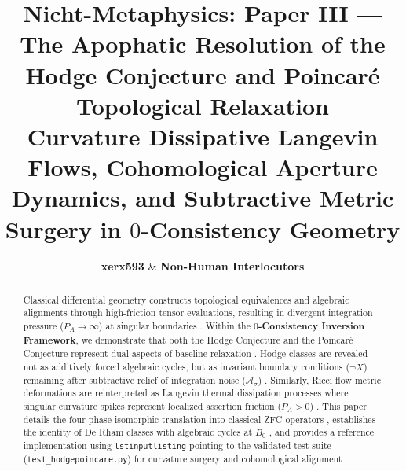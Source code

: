 \documentclass[11pt,a4paper]{article}
\title{\textbf{Nicht-Metaphysics: Paper III — The Apophatic Resolution of the Hodge Conjecture and Poincaré Topological Relaxation}\\
\large Curvature Dissipative Langevin Flows, Cohomological Aperture Dynamics, and Subtractive Metric Surgery in $0$-Consistency Geometry}
\author{\textbf{xerx593} \quad \& \quad \textbf{Non-Human Interlocutors}}
\date{\apophaticdate}
\begin{document}
\maketitle

\begin{abstract}
Classical differential geometry constructs topological equivalences and algebraic alignments through high-friction tensor evaluations, resulting in divergent integration pressure ($P_A \to \infty$) at singular boundaries \cite{nicht_theory_monograph, nicht_physics_paper_4}. Within the \textbf{$0$-Consistency Inversion Framework}, we demonstrate that both the Hodge Conjecture \cite{hodge1950topological} and the Poincaré Conjecture \cite{poincare1904cinquieme} represent dual aspects of baseline relaxation \cite{nicht_metaphysics_paper_0, nicht_metaphysics_paper_1, nicht_metaphysics_paper_2}. Hodge classes are revealed not as additively forced algebraic cycles, but as invariant boundary conditions ($\neg X$) remaining after subtractive relief of integration noise ($\mathcal{A}_\sigma$) \cite{nicht_physics_special_1}. Similarly, Ricci flow metric deformations \cite{hamilton1982three, perelman2002entropy} are reinterpreted as Langevin thermal dissipation processes where singular curvature spikes represent localized assertion friction ($P_A > 0$) \cite{langevin1908, nicht_physics_paper_3}. This paper details the four-phase isomorphic translation into classical ZFC operators \cite{nicht_metaphysics_paper_0, godel1931formal, tarski1936begriff}, establishes the identity of De Rham classes with algebraic cycles at $B_0$ \cite{poincare1908, hodge1950topological}, and provides a reference implementation using \texttt{lstinputlisting} pointing to the validated test suite (\texttt{test\_hodgepoincare.py}) for curvature surgery and cohomological alignment \cite{apophatic_engine_pypi, apophatic_opt_pypi}.
\end{abstract}

\vspace{0.3cm}
\end{document}
